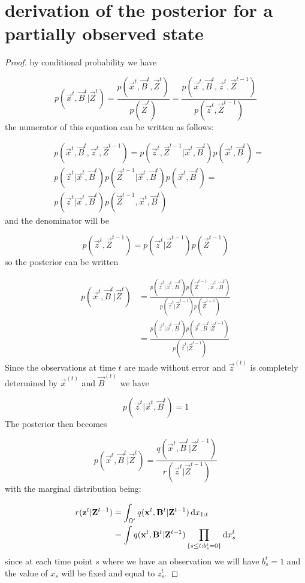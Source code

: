 \section{derivation of the posterior for a partially observed state}

\begin{proof}

by conditional probability we have

\[
    p(\vec{x}^{t},\vec{B}^{t} | \vec{Z}^{t}) = \frac{p(\vec{x}^{t},\vec{B}^{t}, \vec{Z}^{t})}{p(\vec{Z}^{t})} = \frac{p(\vec{x}^{t},\vec{B}^{t}, \vec{z}^{t}, \vec{Z}^{t-1})}{p(\vec{z}^{t},\vec{Z}^{t-1})}
\]
the numerator of this equation can be written as follows:

\begin{align*}
    &p(\vec{x}^{t},\vec{B}^{t}, \vec{z}^{t}, \vec{Z}^{t-1}) = p(\vec{z}^{t}, \vec{Z}^{t-1} | \vec{x}^{t},\vec{B}^{t})p(\vec{x}^{t},\vec{B}^{t}) = \\ 
    &p(\vec{z}^{t} | \vec{x}^{t},\vec{B}^{t}) p(\vec{Z}^{t-1} | \vec{x}^{t},\vec{B}^{t})p(\vec{x}^{t},\vec{B}^{t}) = \\
    &p(\vec{z}^{t} | \vec{x}^{t},\vec{B}^{t}) p(\vec{Z}^{t-1}, \vec{x}^{t} , \vec{B}^{t})
\end{align*}
and the denominator will be

\[
p(\vec{z}^{t},\vec{Z}^{t-1}) = p(\vec{z}^{t} | \vec{Z}^{t-1}) p(\vec{Z}^{t-1}) 
\]
so the posterior can be written

\begin{align*}
    p(\vec{x}^{t},\vec{B}^{t} | \vec{Z}^{t}) &= \frac{p(\vec{z}^{t} | \vec{x}^{t},\vec{B}^{t}) p(\vec{Z}^{t-1}, \vec{x}^{t} , \vec{B}^{t})}{p(\vec{z}^{t} | \vec{Z}^{t-1}) p(\vec{Z}^{t-1}) } \\
    & =\frac{p(\vec{z}^{t} | \vec{x}^{t},\vec{B}^{t}) p(\vec{x}^{t} , \vec{B}^{t} | \vec{Z}^{t-1})}{p(\vec{z}^{t} | \vec{Z}^{t-1})}
\end{align*}
Since the observations at time $t$ are made without error and $\vec{z}^{(t)}$ is completely determined by $\vec{x}^{(t)}$ and $\vec{B}^{(t)}$ we have

\[
    p(\vec{z}^{t} | \vec{x}^{t}, \vec{B}^{t}) = 1
\]
The posterior then becomes

\[
    p(\vec{x}^{t},\vec{B}^{t} | \vec{Z}^{t}) = \frac{q(\vec{x}^{t} , \vec{B}^{t} | \vec{Z}^{t-1})}{r(\vec{z}^{t} | \vec{Z}^{t-1})}
\]
with the marginal distribution being:

\begin{align*}
    r(\mathbf{z}^{t} | \mathbf{Z}^{t-1}) &= \int_{\Omega'} q(\mathbf{x}^{t}, \mathbf{B}^{t}|\mathbf{Z}^{t-1}) \mathop{}\!\mathrm{d} x_{1:t} \\
    &= \int q(\mathbf{x}^{t}, \mathbf{B}^{t}|\mathbf{Z}^{t-1}) \prod_{\{s \leq t: b_s^{t} = 0\}} \mathop{}\!\mathrm{d} x_s^{t}
\end{align*}
since at each time point $s$ where we have an observation we will have $b^{t}_s=1$ and the value of $x_s$ will be fixed and equal to $z^{t}_s$.

\end{proof}

